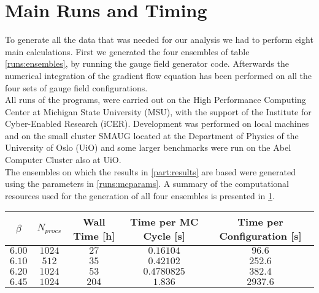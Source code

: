 \section{Main Runs and Timing}
To generate all the data that was needed for our analysis we had to perform eight main calculations. First we generated the four ensembles of table \cref{runs:ensembles}, by running the gauge field generator code. Afterwards the numerical integration of the gradient flow equation has been performed on all the four sets of gauge field configurations.\\
All runs of the programs, were carried out on the High Performance Computing Center at Michigan State University (MSU), with the support of the Institute for Cyber-Enabled Research (iCER). Development was performed on local machines and on the small cluster SMAUG located at the Department of Physics of the University of Oslo (UiO) and some larger benchmarks were run on the Abel Computer Cluster also at UiO.\\
The ensembles on which the results in \cref{part:results} are based were generated using the parameters in  \cref{runs:mcparams}. A summary of the computational resources used for the generation of all four ensembles is presented in \cref{runs:times}. 

\begin{table}[!htb]
    \begin{center}
    \begin{tabular}{ccccc}
        $\beta$ & $N_{procs}$ & Wall Time [h] & Time per MC Cycle [s] & Time per Configuration [s]\\\hline
        $6.00$ & $1024$ & $27$ & $0.16104$  & $96.6$\\
        $6.10$ & $512$ & $35$ & $0.42102$ & $252.6$\\
        $6.20$ & $1024$ & $53$ & $0.4780825$ & $382.4$ \\
        $6.45$ & $1024$ & $204$ & $1.836$ & $2937.6$
    \end{tabular}
    \label{runs:times} 
    \end{center}
\end{table}

